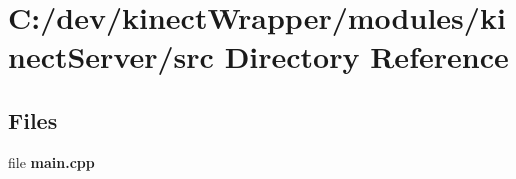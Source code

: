 \section{C\+:/dev/kinect\+Wrapper/modules/kinect\+Server/src Directory Reference}
\label{dir_a1b31a03c5999012deeb52e88e48b55d}
\subsection*{Files}
\begin{DoxyCompactItemize}
\item 
file {\bfseries main.\+cpp}
\end{DoxyCompactItemize}
